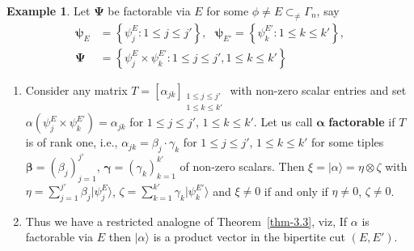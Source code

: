 \documentclass[a4paper,12pt]{article}
\theoremstyle{definition}
\theoremstyle{underlinethm}
\newtheorem{example}{Example}[section]
\theoremstyle{definition}
\begin{document}
\begin{example}\label{example-4.1}
Let $\boldsymbol{\Psi}$ be factorable via $E$ for some $\phi \neq E \subset_{\neq} \Gamma_{n}$, say 
\begin{align*}
\boldsymbol{\psi}_{E} &= \left\{\psi_{j}^{E} : 1 \leq j \leq j' \right\},~~~\boldsymbol{\psi}_{E'} = \left\{\psi_{k}^{E'} : 1 \leq k \leq k' \right\},\\
\boldsymbol{\Psi} &= \left\{\psi_{j}^{E} \times \psi_{k}^{E'} : 1 \leq j \leq j', 1 \leq k \leq k' \right\}
\end{align*}

\begin{enumerate}[label=(\roman*)]
\item Consider any matrix $T = [\alpha_{jk}]_{\substack{1 \leq j \leq j'\\ 1 \leq k \leq k'}}$ with non-zero scalar entries and set $\alpha (\psi_{j}^{E} \times \psi_{k}^{E'}) = \alpha_{jk}$ for $1 \leq j \leq j'$, $1 \leq k \leq k'$. Let us call $\boldsymbol{\alpha}$ \textbf{factorable} if $T$ is of rank one, i.e., $\alpha_{jk} =\beta_{j}\cdot \gamma_{k}$ for $1 \leq j \leq j'$, $1 \leq k \leq k'$ for some tiples $\boldsymbol{\beta} = (\beta_{j})_{j=1}^{j'}$, $\boldsymbol{\gamma} = (\gamma_{k})_{k=1}^{k'}$ of non-zero scalars. Then $\xi = | \alpha \rangle = \eta \otimes \zeta $ with $\eta = \sum\limits_{j=1}^{j'} \beta_{j} | \psi_{j}^{E} \rangle$, $\zeta = \sum\limits_{k=1}^{k'} \gamma_{k} | \psi_{k}^{E'}\rangle$  and $\xi \neq 0$ if and only if $\eta \neq 0$, $\zeta \neq 0$.


\item Thus we have a restricted analogne of Theorem~\eqref{thm-3.3}, viz, If $\alpha$ is factorable via $E$ then $| \alpha \rangle$ is a product vector in the bipertite cut $(E, E')$. 



\end{enumerate}
\end{example}
\end{document}
